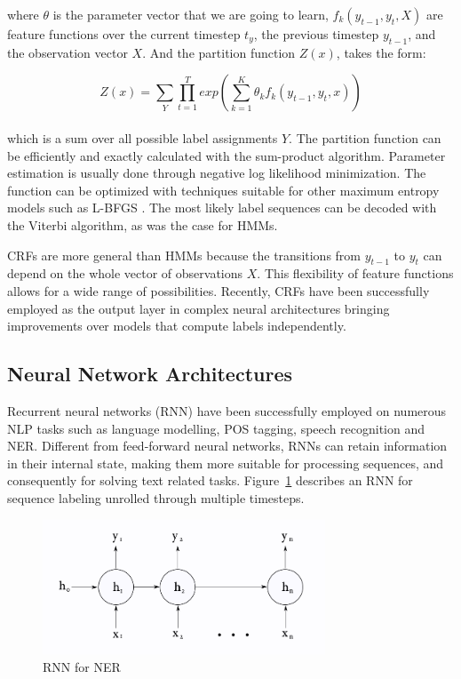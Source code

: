 \documentclass{nle}
\begin{document}
where $ \theta $ is the parameter vector that we are going to learn, $ f_k(y_{t-1}, y_{t}, X) $ 
are feature functions over the current timestep $ t_y $, the previous timestep $ y_{t-1}$, 
and the observation vector $ X $. And the partition function $ Z(x) $, takes the form:

\begin{equation}
Z(x) = \sum_{Y} \prod_{t=1}^{T} exp \left( \sum_{k=1}^{K} \theta_k f_k(y_{t-1}, y_t, x) \right)
\end{equation}
\\

which is a sum over all possible label assignments $ Y $. The partition function can be efficiently
and exactly calculated with the sum-product algorithm. Parameter estimation is usually done through 
negative log likelihood minimization. The function can be optimized with techniques suitable for other 
maximum entropy models such as L-BFGS \cite{Liu1989}. The most likely label sequences can be decoded 
with the Viterbi algorithm, as was the case for HMMs.

CRFs are more general than HMMs because the transitions from $ y_{t-1} $ to $ y_{t} $ can depend 
on the whole vector of observations $ X $. This flexibility of feature functions allows for a wide range of
possibilities. Recently, CRFs have been successfully employed as the output layer in complex neural 
architectures bringing improvements over models that compute labels independently.

\subsection{Neural Network Architectures}

Recurrent neural networks (RNN) have been successfully employed on numerous NLP tasks such as
language modelling, POS tagging, speech recognition and NER. Different from feed-forward 
neural networks, RNNs can retain information in their internal state, making them more 
suitable for processing sequences, and consequently for solving text related tasks. 
Figure~\ref{fig:rnn_network} describes an RNN for sequence labeling unrolled through multiple 
timesteps. 

\begin{figure}[h]
  \centering
  \includegraphics[width=0.75\textwidth]{pics/rnn_network}
  \caption{RNN for NER}
  \label{fig:rnn_network}
\end{figure}
\end{document}
